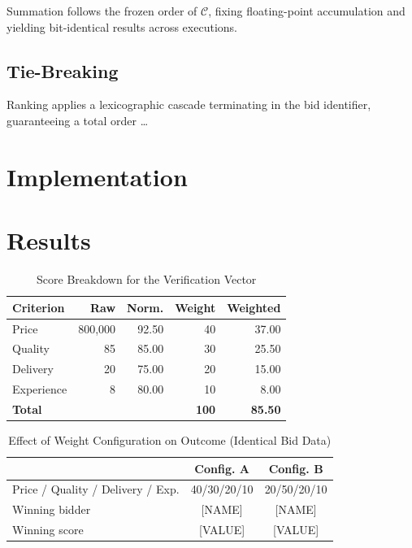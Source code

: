 \documentclass[conference]{IEEEtran}
\begin{document}
Summation follows the frozen order of $\mathcal{C}$, fixing
floating-point accumulation and yielding bit-identical results across
executions.

\subsection{Tie-Breaking}

Ranking applies a lexicographic cascade terminating in the bid
identifier, guaranteeing a total order \dots

\section{Implementation}
\label{sec:impl}

\section{Results}
\label{sec:results}

\begin{table}[htbp]
\caption{Score Breakdown for the Verification Vector}
\begin{center}
\begin{tabular}{lrrrr}
\toprule
\textbf{Criterion} & \textbf{Raw} & \textbf{Norm.} &
\textbf{Weight} & \textbf{Weighted} \\
\midrule
Price       & 800{,}000 & 92.50 & 40 & 37.00 \\
Quality     & 85        & 85.00 & 30 & 25.50 \\
Delivery    & 20        & 75.00 & 20 & 15.00 \\
Experience  & 8         & 80.00 & 10 &  8.00 \\
\midrule
\textbf{Total} & & & \textbf{100} & \textbf{85.50} \\
\bottomrule
\end{tabular}
\label{tab:golden}
\end{center}
\end{table}

\begin{table}[htbp]
\caption{Effect of Weight Configuration on Outcome (Identical Bid Data)}
\begin{center}
\begin{tabular}{lcc}
\toprule
 & \textbf{Config. A} & \textbf{Config. B} \\
\midrule
Price / Quality / Delivery / Exp. & 40/30/20/10 & 20/50/20/10 \\
Winning bidder & [NAME] & [NAME] \\
Winning score  & [VALUE] & [VALUE] \\
\bottomrule
\end{tabular}
\label{tab:flip}
\end{center}
\end{table}
\end{document}
